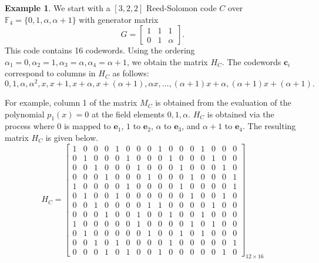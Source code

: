 \documentclass[11pt]{amsart}
\theoremstyle{definition}
\newtheorem{example}[theorem]{Example}
\newcommand{\0}{\mathbf{0}}
\begin{document}
\begin{example} \label{ex:construction}
We start with a $[3, 2, 2]$ Reed-Solomon code $C$ over $\mathbb{F}_4=\{0, 1, \alpha, \alpha+1\}$ with generator matrix 
\[ G = \begin{bmatrix}
    1 & 1 & 1 \\ 
    0 & 1 & \alpha 
\end{bmatrix}. \]
This code contains 16 codewords. Using the ordering $\alpha_1=0, \alpha_2=1, \alpha_3=\alpha, \alpha_4=\alpha+1$, we obtain the matrix $H_C$. The codewords $\mathbf{c}_i$ correspond to columns in $H_C$ as follows:
\[ 0, 1, \alpha, \alpha^2, x, x+1, x+\alpha, x+(\alpha+1), \alpha x, \ldots, (\alpha+1)x+\alpha, (\alpha+1)x+(\alpha+1).\]

For example, column 1 of the matrix $M_C$ is obtained from the evaluation of the polynomial $p_1(x)=0$ at the field elements $0, 1, \alpha$.
$H_C$ is obtained via the process where 
$0$ is mapped to $\mathbf{e}_1$, $1$ to $\mathbf{e}_2$, $\alpha$ to $\mathbf{e}_3$, and $\alpha+1$ to $\mathbf{e}_4$. The resulting matrix $H_C$ is given below.
\begin{equation} \label{eq:matrix}
    {H_C = \left[
        \begin{array}{cc|cc||cc|cc||cc|cc||cc|cc}
            1 & 0 & 0 & 0 & 1 & 0 & 0 & 0 & 1 & 0 & 0 & 0 & 1 & 0 & 0 & 0 \\
            0 & 1 & 0 & 0 & 0 & 1 & 0 & 0 & 0 & 1 & 0 & 0 & 0 & 1 & 0 & 0 \\ \hline
            0 & 0 & 1 & 0 & 0 & 0 & 1 & 0 & 0 & 0 & 1 & 0 & 0 & 0 & 1 & 0 \\
            0 & 0 & 0 & 1 & 0 & 0 & 0 & 1 & 0 & 0 & 0 & 1 & 0 & 0 & 0 & 1 \\
            \hline \hline
            1 & 0 & 0 & 0 & 0 & 1 & 0 & 0 & 0 & 0 & 1 & 0 & 0 & 0 & 0 & 1\\
            0 & 1 & 0 & 0 & 1 & 0 & 0 & 0 & 0 & 0 & 0 & 1 & 0 & 0 & 1 & 0 \\ \hline
            0 & 0 & 1 & 0 & 0 & 0 & 0 & 1 & 1 & 0 & 0 & 0 & 0 & 1 & 0 & 0 \\
            0 & 0 & 0 & 1 & 0 & 0 & 1 & 0 & 0 & 1 & 0 & 0 & 1 & 0 & 0 & 0 \\
            \hline \hline
            1 & 0 & 0 & 0 & 0 & 0 & 1 & 0 & 0 & 0 & 0 & 1 & 0 & 1 & 0 & 0 \\
            0 & 1 & 0 & 0 & 0 & 0 & 0 & 1 & 0 & 0 & 1 & 0 & 1 & 0 & 0 & 0 \\ \hline 
            0 & 0 & 1 & 0 & 1 & 0 & 0 & 0 & 0 & 1 & 0 & 0 & 0 & 0 & 0 & 1 \\
            0 & 0 & 0 & 1 & 0 & 1 & 0 & 0 & 1 & 0 & 0 & 0 & 0 & 0 & 1 & 0 
        \end{array} \right]_{12 \times 16}}
\end{equation}


\end{example}
\end{document}
